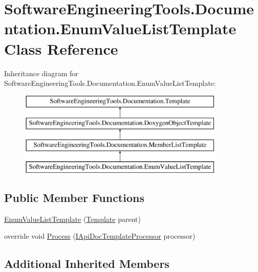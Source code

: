 \hypertarget{class_software_engineering_tools_1_1_documentation_1_1_enum_value_list_template}{\section{Software\+Engineering\+Tools.\+Documentation.\+Enum\+Value\+List\+Template Class Reference}
\label{class_software_engineering_tools_1_1_documentation_1_1_enum_value_list_template}
}
Inheritance diagram for Software\+Engineering\+Tools.\+Documentation.\+Enum\+Value\+List\+Template\+:\begin{figure}[H]
\begin{center}
\leavevmode
\includegraphics[height=4.000000cm]{class_software_engineering_tools_1_1_documentation_1_1_enum_value_list_template}
\end{center}
\end{figure}
\subsection*{Public Member Functions}
\begin{DoxyCompactItemize}
\item 
\hyperlink{class_software_engineering_tools_1_1_documentation_1_1_enum_value_list_template_a9bece1c364eecf7a8ee83f4e20407080}{Enum\+Value\+List\+Template} (\hyperlink{class_software_engineering_tools_1_1_documentation_1_1_template}{Template} parent)
\item 
override void \hyperlink{class_software_engineering_tools_1_1_documentation_1_1_enum_value_list_template_afe9c0fe4292f4fe2a72e93b9dce44da6}{Process} (\hyperlink{interface_software_engineering_tools_1_1_documentation_1_1_i_api_doc_template_processor}{I\+Api\+Doc\+Template\+Processor} processor)
\end{DoxyCompactItemize}
\subsection*{Additional Inherited Members}


